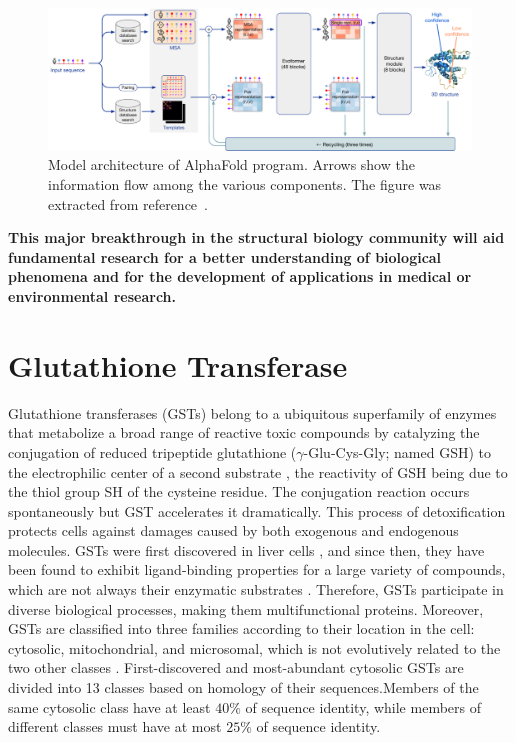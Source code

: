  \begin{figure}[h!]
 	\includegraphics[width=16cm]{../figures/figure_AF_scheme.pdf}
 	\caption{Model architecture of AlphaFold program. Arrows show the information flow among the various components. The figure was extracted from reference~\cite{AlphaFold}.}
 	\label{FIG1}
 \end{figure}
  
  \textbf{This major breakthrough in the structural biology community will aid fundamental research for a better understanding of biological phenomena and for the development of applications in medical or environmental research.}
 
\section{Glutathione Transferase}
Glutathione transferases (GSTs) belong to a ubiquitous superfamily of enzymes that
metabolize a broad range of reactive toxic compounds by catalyzing the conjugation of reduced tripeptide glutathione ($\gamma$-Glu-Cys-Gly; named GSH) to the electrophilic center of a second substrate \cite{mannervik1985isoenzymes, armstrong1997structure, hayes2005glutathione}, the reactivity of GSH being due to the thiol group SH of the cysteine residue. The conjugation reaction occurs spontaneously but GST accelerates it dramatically. This process of detoxification protects cells against damages caused by both exogenous and endogenous molecules. GSTs were first discovered in liver cells \cite{combes1961liver}, and since then, they have been found to exhibit ligand-binding properties for a large variety of compounds, which are not always their enzymatic substrates \cite{axarli2004characterization}. Therefore, GSTs participate in diverse biological processes, making them multifunctional proteins. Moreover, GSTs are classified into three families according to their location in the cell: cytosolic, mitochondrial, and microsomal, which is not evolutively related to the two other classes \cite{oakley2011glutathione}. First-discovered and most-abundant cytosolic GSTs are divided into 13 classes based on homology of their sequences.Members of the same cytosolic class have at least $40\%$ of sequence identity, while members of different classes must have at most $25\%$ of sequence identity. 

